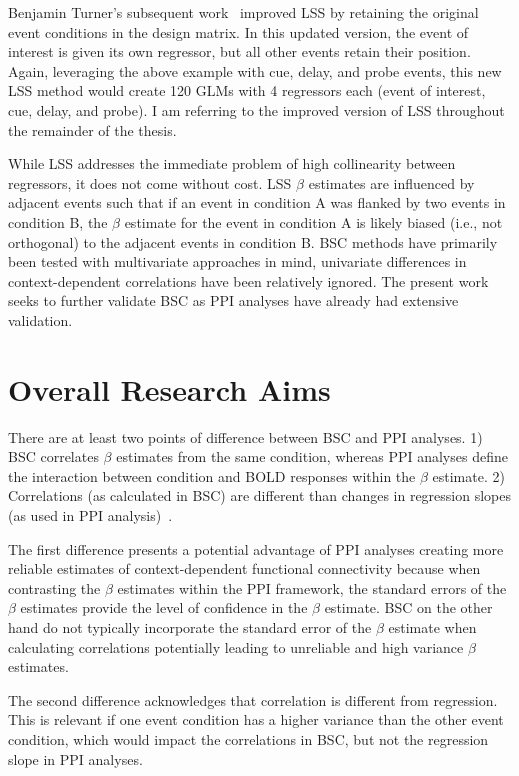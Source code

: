\documentclass[phd,figures,tables,ackpage,abstractpage,publicabstractpage]{uithesis}
\begin{document}
Benjamin Turner's subsequent work~\cite{Turner2012a} improved LSS by retaining
the original event conditions in the design matrix.
In this updated version, the event of interest is given its own regressor, but all
other events retain their position.
Again, leveraging the above example with cue, delay, and probe events,
this new LSS method would create 120 GLMs with 4 regressors each (event of interest, cue, delay, and probe).
I am referring to the improved version of LSS throughout the remainder of the thesis.

While LSS addresses the immediate problem of high collinearity between regressors,
it does not come without cost.
LSS $\beta$ estimates are influenced by adjacent events such that if an event in condition A
was flanked by two events in condition B, the $\beta$ estimate for the event in condition A
is likely biased (i.e., not orthogonal) to the adjacent events in condition B.
BSC methods have primarily been tested with multivariate approaches in mind, univariate
differences in context-dependent correlations have been relatively ignored.
The present work seeks to further validate BSC as PPI analyses have already had
extensive validation.

\section{Overall Research Aims}

There are at least two points of difference between BSC and PPI analyses.
1) BSC correlates $\beta$ estimates from the same condition, whereas PPI analyses define
the interaction between condition and BOLD responses within the $\beta$ estimate.
2) Correlations (as calculated in BSC) are different than changes in regression slopes
(as used in PPI analysis)~\cite{Di2019}.

The first difference presents a potential advantage of PPI analyses creating more reliable
estimates of context-dependent functional connectivity because when contrasting the $\beta$ estimates
within the PPI framework, the standard errors of the $\beta$ estimates provide the level of
confidence in the $\beta$ estimate.
BSC on the other hand do not typically incorporate the standard error of the $\beta$ estimate
when calculating correlations potentially leading to unreliable and high variance $\beta$
estimates.

The second difference acknowledges that correlation is different from regression.
This is relevant if one event condition has a higher variance than the other event condition,
which would impact the correlations in BSC, but not the regression slope in PPI analyses.
\end{document}
